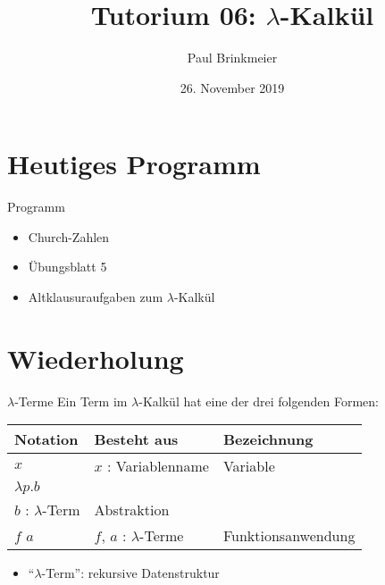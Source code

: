 \documentclass{beamer}
\title{Tutorium 06: $\lambda$-Kalkül}
\author{Paul Brinkmeier}
\institute{Tutorium Programmierparadigmen am KIT}
\date{26. November 2019}
\begin{document}
\begin{frame}
	\titlepage
\end{frame}

\section{Heutiges Programm}
\begin{frame}{Programm}
	\begin{itemize}
		\item Church-Zahlen
		\item Übungsblatt 5
		\item Altklausuraufgaben zum $\lambda$-Kalkül
	\end{itemize}
\end{frame}

\section{Wiederholung}

\begin{frame}{$\lambda$-Terme}
	Ein Term im $\lambda$-Kalkül hat eine der drei folgenden Formen:

	\vspace{0.5cm}

	\begin{tabularx}{\textwidth}{ X | X | X }
		\textbf{Notation} & \textbf{Besteht aus}                      & \textbf{Bezeichnung} \\
		\hline
		$x$               & $x$ : Variablenname                       & Variable             \\
		\hline
		$\lambda{}p.b$    &
			\begin{tabular}[t]{@{}c@{}}$p$ : Variablenname\\$b$ : $\lambda$-Term\end{tabular}
									      & Abstraktion          \\
		\hline
		$f$ $a$           & $f$, $a$ : $\lambda$-Terme                & Funktionsanwendung   \\
	\end{tabularx}

	\vspace{0.5cm}

	\begin{itemize}
		\item \enquote{$\lambda$-Term}: rekursive Datenstruktur
	\end{itemize}
\end{frame}
\end{document}
